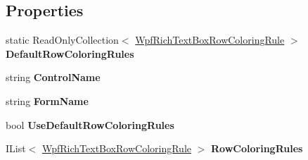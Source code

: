 \subsection*{Properties}
\begin{DoxyCompactItemize}
\item 
static Read\+Only\+Collection$<$ \hyperlink{class_power_system_planning_wpf_app_1_1_helper_1_1_wpf_rich_text_box_row_coloring_rule}{Wpf\+Rich\+Text\+Box\+Row\+Coloring\+Rule} $>$ {\bfseries Default\+Row\+Coloring\+Rules}\hypertarget{class_power_system_planning_wpf_app_1_1_helper_1_1_wpf_rich_text_box_target_a12af7f68cd9b18eea4250828c668b3a6}{}\label{class_power_system_planning_wpf_app_1_1_helper_1_1_wpf_rich_text_box_target_a12af7f68cd9b18eea4250828c668b3a6}

\item 
string {\bfseries Control\+Name}\hypertarget{class_power_system_planning_wpf_app_1_1_helper_1_1_wpf_rich_text_box_target_a780505a664466d84a8ec2b7b286454ef}{}\label{class_power_system_planning_wpf_app_1_1_helper_1_1_wpf_rich_text_box_target_a780505a664466d84a8ec2b7b286454ef}

\item 
string {\bfseries Form\+Name}\hypertarget{class_power_system_planning_wpf_app_1_1_helper_1_1_wpf_rich_text_box_target_a85a08efd7484c91c55e75219e0640fc5}{}\label{class_power_system_planning_wpf_app_1_1_helper_1_1_wpf_rich_text_box_target_a85a08efd7484c91c55e75219e0640fc5}

\item 
bool {\bfseries Use\+Default\+Row\+Coloring\+Rules}\hypertarget{class_power_system_planning_wpf_app_1_1_helper_1_1_wpf_rich_text_box_target_a4cdb7f5fc49d7bfe8af5be0b9669d8cf}{}\label{class_power_system_planning_wpf_app_1_1_helper_1_1_wpf_rich_text_box_target_a4cdb7f5fc49d7bfe8af5be0b9669d8cf}

\item 
I\+List$<$ \hyperlink{class_power_system_planning_wpf_app_1_1_helper_1_1_wpf_rich_text_box_row_coloring_rule}{Wpf\+Rich\+Text\+Box\+Row\+Coloring\+Rule} $>$ {\bfseries Row\+Coloring\+Rules}\hypertarget{class_power_system_planning_wpf_app_1_1_helper_1_1_wpf_rich_text_box_target_a80644b87c8076868928f54d4bef865c3}{}\label{class_power_system_planning_wpf_app_1_1_helper_1_1_wpf_rich_text_box_target_a80644b87c8076868928f54d4bef865c3}


\end{DoxyCompactItemize}
